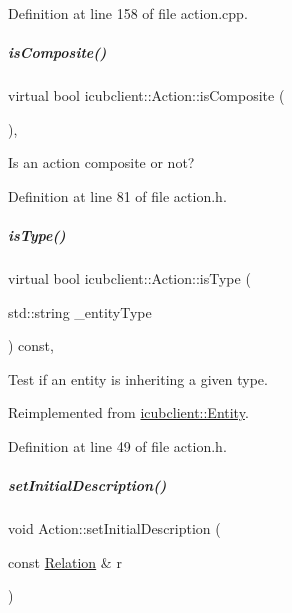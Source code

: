 Definition at line 158 of file action.\+cpp.

\mbox{\label{group__icubclient__representations_a082ed3f3c38800ae49ab9d8ef991de8b}} 
\subparagraph{\texorpdfstring{is\+Composite()}{isComposite()}}
{\footnotesize\ttfamily virtual bool icubclient\+::\+Action\+::is\+Composite (\begin{DoxyParamCaption}{ }\end{DoxyParamCaption})\hspace{0.3cm}{\ttfamily [inline]}, {\ttfamily [virtual]}}



Is an action composite or not? 



Definition at line 81 of file action.\+h.

\mbox{\label{group__icubclient__representations_a928f5814d5160e14157391cd85c0cbd0}} 
\subparagraph{\texorpdfstring{is\+Type()}{isType()}}
{\footnotesize\ttfamily virtual bool icubclient\+::\+Action\+::is\+Type (\begin{DoxyParamCaption}\item[{std\+::string}]{\+\_\+entity\+Type }\end{DoxyParamCaption}) const\hspace{0.3cm}{\ttfamily [inline]}, {\ttfamily [virtual]}}



Test if an entity is inheriting a given type. 



Reimplemented from \hyperlink{group__icubclient__representations_a5cbd0e5e254b3881a6a0adfc28107eb5}{icubclient\+::\+Entity}.



Definition at line 49 of file action.\+h.

\mbox{\label{group__icubclient__representations_a5b8e483eea56d34bc0724f469410580b}} 
\subparagraph{\texorpdfstring{set\+Initial\+Description()}{setInitialDescription()}}
{\footnotesize\ttfamily void Action\+::set\+Initial\+Description (\begin{DoxyParamCaption}\item[{const \hyperlink{group__icubclient__representations_classicubclient_1_1Relation}{Relation} \&}]{r }\end{DoxyParamCaption})}



